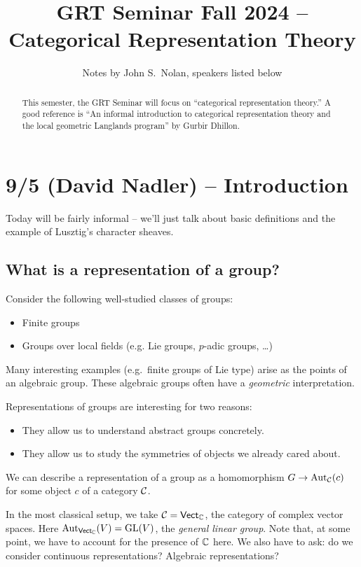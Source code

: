 \documentclass{article}
\title{GRT Seminar Fall 2024 -- Categorical Representation Theory}
\author{Notes by John S.\ Nolan, speakers listed below}
\begin{document}
\maketitle

\begin{abstract}
	This semester, the GRT Seminar will focus on ``categorical representation theory.''
	A good reference is ``An informal introduction to categorical representation theory and the local geometric Langlands program'' by Gurbir Dhillon.
\end{abstract}

\tableofcontents

\section{9/5 (David Nadler) -- Introduction}

Today will be fairly informal -- we'll just talk about basic definitions and the example of Lusztig's character sheaves.

\subsection{What is a representation of a group?}

Consider the following well-studied classes of groups:
\begin{itemize}
	\item Finite groups
	\item Groups over local fields (e.g. Lie groups, $p$-adic groups, \dots)
\end{itemize}
Many interesting examples (e.g.\ finite groups of Lie type) arise as the points of an algebraic group.
These algebraic groups often have a \emph{geometric} interpretation.

Representations of groups are interesting for two reasons:
\begin{itemize}
	\item They allow us to understand abstract groups concretely.
	\item They allow us to study the symmetries of objects we already cared about.
\end{itemize}
We can describe a representation of a group as a homomorphism $G \to \operatorname{Aut}_{\mathcal{C}}(c)$ for some object $c$ of a category $\mathcal{C}$.

\begin{ex}
	In the most classical setup, we take $\mathcal{C} = \mathsf{Vect}_{\mathbb{C}}$, the category of complex vector spaces.
	Here $\operatorname{Aut}_{\mathsf{Vect}_{\mathbb{C}}}(V) = \operatorname{GL}(V)$, the \emph{general linear group}.
	Note that, at some point, we have to account for the presence of $\mathbb{C}$ here.
	We also have to ask: do we consider continuous representations? Algebraic representations?
\end{ex}
\end{document}
